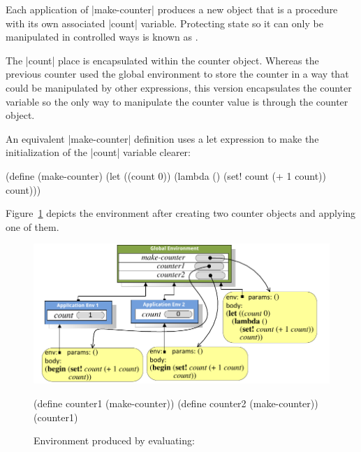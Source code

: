 \begin{schemeregion}
Each application of \scheme|make-counter| produces a new object that is a procedure with its own associated \scheme|count| variable.  Protecting state so it can only be manipulated in controlled ways is known as .  

The \scheme|count| place is encapsulated within the counter object.  Whereas the previous counter used the global environment to store the counter in a way that could be manipulated by other expressions, this version encapsulates the counter variable so the only way to manipulate the counter value is through the counter object. 

An equivalent \scheme|make-counter| definition uses a let expression to make the initialization of the \scheme|count| variable clearer:

\begin{schemedisplay}
(define (make-counter)
  (let ((count 0))
    (lambda () (set! count (+ 1 count)) count)))
\end{schemedisplay}

Figure~\ref{fig:make-counter} depicts the environment after creating two counter objects and applying one of them.

\begin{figure}[bth]
\begin{center}
\includegraphics[width=5.0in]{figures/make-counter.pdf}
\caption{Environment produced by evaluating:}\label{fig:make-counter}
\vspace{-1.5ex}
\begin{schemedisplay}
(define counter1 (make-counter)) 
(define counter2 (make-counter)) 
(counter1)
\end{schemedisplay}
\end{center}
\end{figure}
 

\end{schemeregion}
